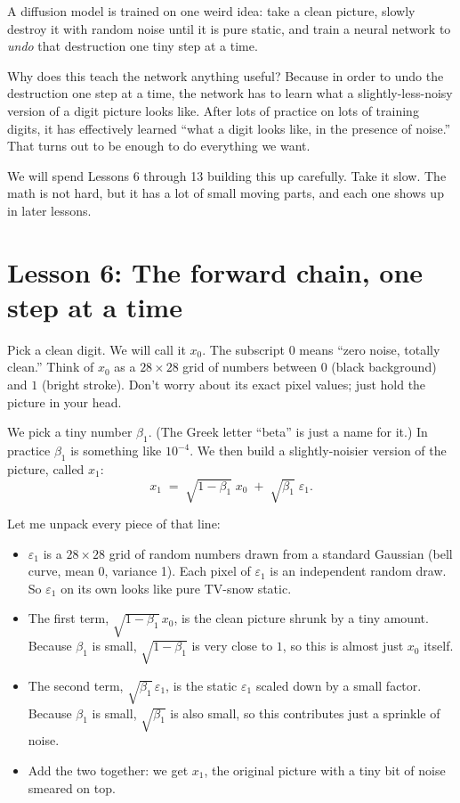 \documentclass[11pt]{article}
\begin{document}
A diffusion model is trained on one weird idea: take a clean picture,
slowly destroy it with random noise until it is pure static, and train
a neural network to \emph{undo} that destruction one tiny step at a
time.

Why does this teach the network anything useful? Because in order to
undo the destruction one step at a time, the network has to learn what
a slightly-less-noisy version of a digit picture looks like. After lots
of practice on lots of training digits, it has effectively learned
``what a digit looks like, in the presence of noise.'' That turns out
to be enough to do everything we want.

We will spend Lessons 6 through 13 building this up carefully. Take it
slow. The math is not hard, but it has a lot of small moving parts, and
each one shows up in later lessons.

\section{Lesson 6: The forward chain, one step at a time}

Pick a clean digit. We will call it $x_0$. The subscript $0$ means
``zero noise, totally clean.'' Think of $x_0$ as a $28\times 28$ grid
of numbers between $0$ (black background) and $1$ (bright stroke). Don't
worry about its exact pixel values; just hold the picture in your head.

We pick a tiny number $\beta_1$. (The Greek letter ``beta'' is just a
name for it.) In practice $\beta_1$ is something like $10^{-4}$. We then
build a slightly-noisier version of the picture, called $x_1$:
\[
x_1 \;=\; \sqrt{1 - \beta_1}\;x_0 \;+\; \sqrt{\beta_1}\;\varepsilon_1.
\]

Let me unpack every piece of that line:
\begin{itemize}[leftmargin=2em]
\item $\varepsilon_1$ is a $28\times 28$ grid of random numbers drawn
  from a standard Gaussian (bell curve, mean 0, variance 1). Each pixel
  of $\varepsilon_1$ is an independent random draw. So $\varepsilon_1$
  on its own looks like pure TV-snow static.
\item The first term, $\sqrt{1 - \beta_1}\,x_0$, is the clean picture
  shrunk by a tiny amount. Because $\beta_1$ is small,
  $\sqrt{1 - \beta_1}$ is very close to $1$, so this is almost just
  $x_0$ itself.
\item The second term, $\sqrt{\beta_1}\,\varepsilon_1$, is the static
  $\varepsilon_1$ scaled down by a small factor. Because $\beta_1$ is
  small, $\sqrt{\beta_1}$ is also small, so this contributes just a
  sprinkle of noise.
\item Add the two together: we get $x_1$, the original picture with a
  tiny bit of noise smeared on top.
\end{itemize}
\end{document}
